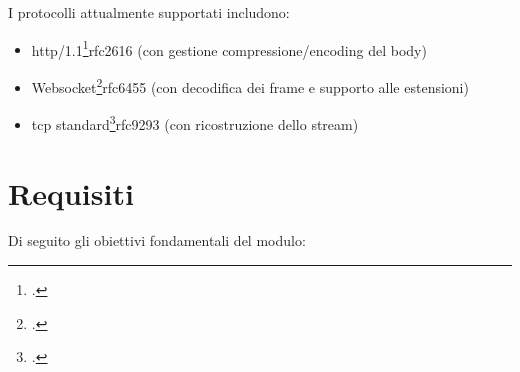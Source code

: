 I protocolli attualmente supportati includono:
\begin{itemize}
    \setlength{\itemsep}{4pt}
    \setlength{\parskip}{4pt}
    \item \gls{http}/1.1\footcite{RFC2616, Hypertext Transfer Protocol -- HTTP/1.1}{rfc2616} (con gestione compressione/encoding del body)
    \item Websocket\footcite{RFC6455, The WebSocket Protocol}{rfc6455} (con decodifica dei frame e supporto alle estensioni)
    \item \gls{tcp} standard\footcite{RFC9293, Transmission Control Protocol (TCP)}{rfc9293} (con ricostruzione dello stream)
\end{itemize}

\section{Requisiti}

Di seguito gli obiettivi fondamentali del modulo:

